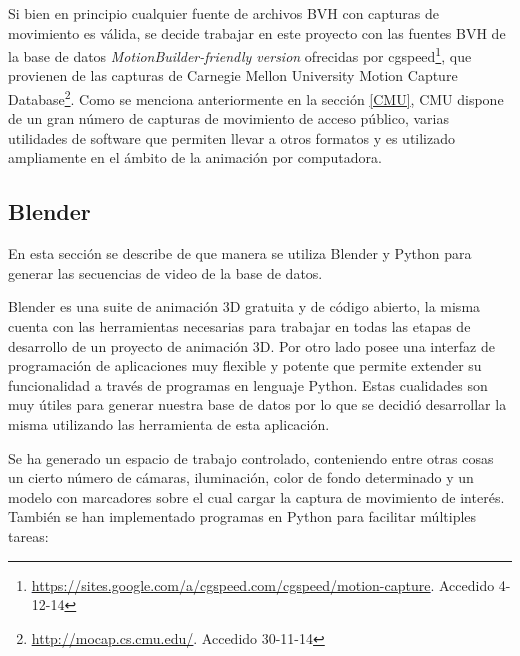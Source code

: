 Si bien en principio cualquier fuente de archivos BVH con capturas de movimiento es válida, se decide trabajar en este proyecto con las fuentes BVH de la base de datos \textit{MotionBuilder-friendly version} ofrecidas por cgspeed\footnote{\textcolor{blue}{\underline{\url{https://sites.google.com/a/cgspeed.com/cgspeed/motion-capture}}}. Accedido 4-12-14},
 que provienen de las capturas de Carnegie Mellon University Motion Capture Database\footnote{\textcolor{blue}{\underline{\url{http://mocap.cs.cmu.edu/}}}. Accedido 30-11-14}. 
 Como se menciona anteriormente en la sección \ref{CMU}, CMU dispone de un gran número de capturas de movimiento de acceso público, varias utilidades de software que permiten llevar a otros formatos y es utilizado ampliamente en el ámbito de la animación por computadora.




\subsection{Blender} %
En esta sección se describe de que manera se utiliza Blender y Python para generar las secuencias de video de la base de datos.





Blender es una suite de animación 3D gratuita y de código abierto, la misma cuenta con las herramientas necesarias para trabajar en todas las etapas de desarrollo de un proyecto de animación 3D. Por otro lado posee una interfaz de programación de aplicaciones muy flexible y potente que permite extender su funcionalidad a través de programas en lenguaje Python. Estas cualidades son muy útiles para generar nuestra base de datos por lo que se decidió desarrollar la misma utilizando las herramienta de esta aplicación.

Se ha generado un espacio de trabajo controlado, conteniendo entre otras cosas un cierto número de cámaras, iluminación, color de fondo determinado y un modelo con marcadores sobre el cual cargar la captura de movimiento de interés. También se han implementado programas en Python para facilitar múltiples tareas:

